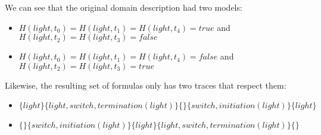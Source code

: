 We can see that the original domain description had two models:
\begin{itemize}
  \item $H(light,t_0)=H(light,t_1)=H(light,t_4)=true$ and $H(light,t_2)=H(light,t_3)=false$
  \item $H(light,t_0)=H(light,t_1)=H(light,t_4)=false$ and $H(light,t_2)=H(light,t_3)=true$
\end{itemize}

Likewise, the resulting set of formulas only has two traces that respect them:
\begin{itemize}
  \item $\{light\}\{light,switch,termination(light)\}\{\}\{switch,initiation(light)\}\{light\}$
  \item $\{\}\{switch,initiation(light)\}\{light\}\{light,switch,termination(light)\}\{\}$
\end{itemize}
